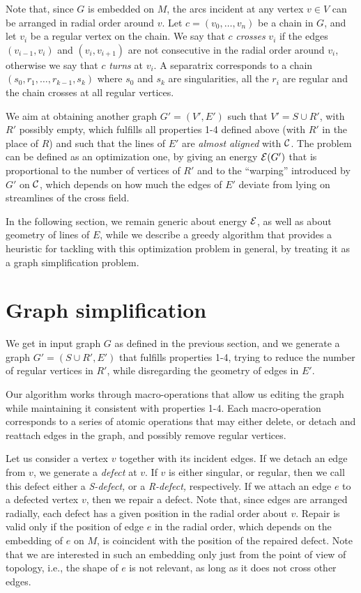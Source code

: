 \documentclass[11pt,a4paper]{article}
\begin{document}
Note that, since $G$ is embedded on $M$, the arcs incident at any vertex $v\in V$ can be arranged in radial order around $v$.
Let $c=(v_0,\ldots,v_n)$ be a chain in $G$, and let $v_i$ be a regular vertex on the chain. 
We say that $c$ \emph{crosses} $v_i$ if the edges $(v_{i-1},v_i)$ and  $(v_i,v_{i+1})$ are not consecutive in the radial order around $v_i$, otherwise we say that $c$ \emph{turns} at $v_i$.
A separatrix corresponds to a chain $(s_0,r_1,\ldots,r_{k-1},s_k)$ where $s_0$ and $s_k$ are singularities, all the $r_i$ are regular and the chain crosses at all regular vertices.

We aim at obtaining another graph $G'=(V',E')$ such that $V'=S\cup R'$, with $R'$ possibly empty, which fulfills all properties 1-4 defined above (with $R'$ in the place of $R$) and such that the lines of $E'$ are \emph{almost aligned} with $\cal C$. 
The problem can be defined as an optimization one, by giving an energy ${\cal E}(G')$ that is proportional to the number of vertices of $R'$ and to the ``warping'' introduced by $G'$ on $\cal C$, which depends on how much the edges of $E'$ deviate from lying on streamlines of the cross field.

In the following section, we remain generic about energy $\cal E$, as well as about geometry of lines of $E$, while we describe a greedy algorithm that provides a heuristic for tackling with this optimization problem in general, by treating it as a graph simplification problem. 




\section{Graph simplification}
\label{sec:simpl}

We get in input graph  $G$ as defined in the previous section, and we generate a graph $G'=(S\cup R',E')$ that fulfills properties 1-4, trying to reduce the number of regular vertices in $R'$, while disregarding the geometry of edges in $E'$. 

Our algorithm works through macro-operations that allow us editing the graph while maintaining it consistent with properties 1-4.
Each macro-operation corresponds to a series of atomic operations that may either delete, or detach and reattach edges in the graph, and possibly remove regular vertices. 

Let us consider a vertex $v$ together with its incident edges. 
If we detach an edge from $v$, we generate a \emph{defect} at $v$.
If $v$ is either singular, or regular, then we call this defect either a \emph{S-defect,} or a \emph{R-defect,} respectively. 
If we attach an edge $e$ to a defected vertex $v$, then we repair a defect.
Note that, since edges are arranged radially, each defect has a given position in the radial order about $v$.
Repair is valid only if the position of edge $e$ in the radial order, which depends on the embedding of $e$ on $M$, is coincident with the position of the repaired defect. 
Note that we are interested in such an embedding only just from the point of view of topology, i.e., the shape of $e$ is not relevant, as long as it does not cross other edges. 
\end{document}
